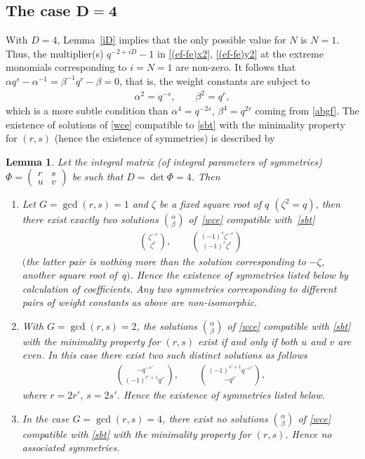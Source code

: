\documentclass[10pt,a4paper]{amsart}
\numberwithin{equation}{section}
\newtheorem{Lemma}[Theorem]{Lemma}
\begin{document}
\subsection[The case $D=4$]{The case $\boldsymbol{D=4}$}

With $D=4$, Lemma~\ref{iD} implies that the only possible value for $N$ is $N=1$. Thus, the multiplier(s) $q^{-2+iD}-1$ in \eqref{(ef-fe)x2}, \eqref{(ef-fe)y2} at the extreme monomials corresponding to $i=N=1$ are non-zero. It follows that $\alpha q^s-\alpha^{-1}=\beta^{-1}q^r-\beta=0$, that is, the weight constants are subject to
\begin{gather}\label{sbt}
\alpha^2=q^{-s},\qquad\beta^2=q^r,
\end{gather}
which is a more subtle condition than $\alpha^4=q^{-2s}$, $\beta^4=q^{2r}$ coming from \eqref{abgf}. The existence of solutions of \eqref{wce} compatible to \eqref{sbt} with the minimality property for $(r,s)$ (hence the existence of symmetries) is described by

\begin{Lemma}\label{lem_det4}
Let the integral matrix (of integral parameters of symmetries) $\Phi=\left(\begin{smallmatrix}r & s\\ u & v\end{smallmatrix}\right)$ be such that $D=\det\Phi=4$. Then
\begin{enumerate}\itemsep=0pt
\item[$1.$] Let $G=\operatorname{gcd}(r,s)=1$ and $\zeta$ be a fixed square root of $q$ $(\zeta^2=q)$, then there exist exactly two solutions $\binom{\alpha}{\beta}$ of~\eqref{wce} compatible with~\eqref{sbt}
 \begin{gather*}
 \binom{\zeta^{-s}}{\zeta^r},\qquad\binom{(-1)^s\zeta^{-s}}{(-1)^r\zeta^r}
 \end{gather*}
$($the latter pair is nothing more than the solution corresponding to $-\zeta$, another square root of~$q)$. Hence the existence of symmetries listed below by calculation of coefficients. Any two symmetries corresponding to different pairs of weight constants as above are non-isomorphic.
\item[$2.$] With $G=\operatorname{gcd}(r,s)=2$, the solutions $\binom{\alpha}{\beta}$ of \eqref{wce} compatible with \eqref{sbt} with the minima\-li\-ty property for $(r,s)$ exist if and only if both $u$ and $v$ are even. In this case there exist two such distinct solutions as follows{\samepage
 \begin{gather*}
 \binom{-q^{-s'}}{(-1)^{r'+1}q^{r'}},\qquad \binom{(-1)^{s'+1}q^{-s'}}{-q^{r'}},
 \end{gather*}
 where $r=2r'$, $s=2s'$. Hence the existence of symmetries listed below.}
\item[$3.$] In the case $G=\operatorname{gcd}(r,s)=4$, there exist no solutions $\binom{\alpha}{\beta}$ of \eqref{wce} compatible with \eqref{sbt} with the minimality property for $(r,s)$. Hence no associated symmetries.
\end{enumerate}
\end{Lemma}
\end{document}
